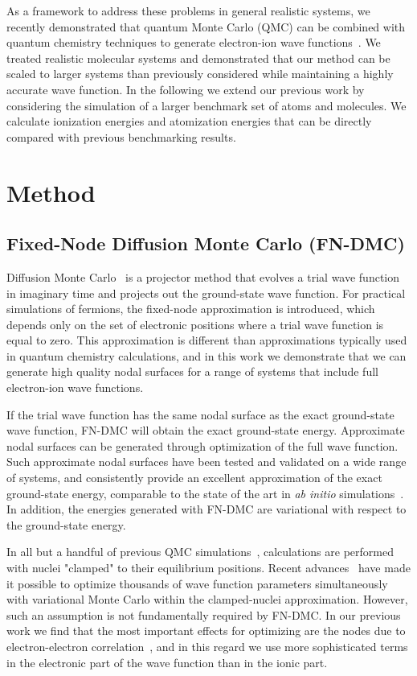 \documentclass[pra,superscriptaddress,groupedaddress,twocolumn]{revtex4}
\begin{document}
As a framework to address these problems in general realistic systems, we recently demonstrated that quantum Monte Carlo (QMC) can be combined with quantum chemistry techniques to generate electron-ion wave functions~\cite{Tubman_ECG}. We treated realistic molecular systems and demonstrated that our method can be scaled to larger systems than previously considered while maintaining a highly accurate wave function. In the following we extend our previous work by considering the simulation of a larger benchmark set of atoms and molecules.  We calculate ionization energies and atomization energies that can be directly compared with previous benchmarking results.

\section{Method}
\subsection{Fixed-Node Diffusion Monte Carlo (FN-DMC)}
Diffusion Monte Carlo~\cite{Anderson_DMC,lester1,Stuart_Review,Needs_Review,Needs_Old_Review,QMC_Review} is a projector method that evolves a trial wave function in imaginary time and projects out the ground-state wave function. For practical simulations of fermions, the fixed-node approximation is introduced, which depends only on the set of electronic positions where a trial wave function is equal to zero.  This approximation is different than approximations typically used in quantum chemistry calculations, and in this work we demonstrate that we can generate high quality nodal surfaces for a range of systems that include full electron-ion wave functions. 

If the trial wave function has the same nodal surface as the exact ground-state wave function, FN-DMC will obtain the exact ground-state energy.  Approximate nodal surfaces can be generated through optimization of the full wave function. Such approximate nodal surfaces have been tested and validated on a wide range of systems, and consistently provide an excellent approximation of the exact ground-state energy,  comparable to the state of the art in \textit{ab initio} simulations~\cite{grossman1}. In addition, the energies generated with FN-DMC are variational with respect to the ground-state energy.

In all but a handful of previous QMC simulations~\cite{Ceperley_1987,Natoli_1993,Natoli_1995,Chen_1995,Coldwell_H2_2008,Gabriele_H2_2004,Sandro_finiteT-noBO_2012}, calculations are performed with nuclei "clamped" to their equilibrium positions. Recent advances~\cite{Nightingale_Linear,Umrigar_Linear,Brown_Bench} have made it possible to optimize thousands of wave function parameters simultaneously with variational Monte Carlo within the clamped-nuclei approximation. However, such an assumption is not fundamentally required by FN-DMC. In our previous work we find that the most important effects for optimizing are the nodes due to electron-electron correlation~\cite{Tubman_ECG}, and in this regard we use more sophisticated terms in the electronic part of the wave function than in the ionic part.
\end{document}
